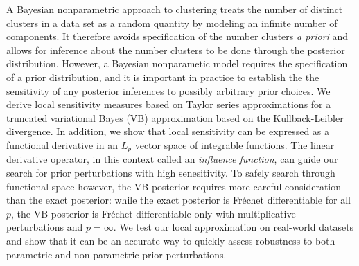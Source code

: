 A Bayesian nonparametric approach to clustering treats the number of distinct
clusters in a data set as a random quantity by modeling an infinite number of
components.  It therefore avoids specification of the number clusters \textit{a
priori} and allows for inference about the number clusters to be done through
the posterior distribution. However, a Bayesian nonparametic model requires the
specification of a prior distribution, and it is important in practice to
establish the the sensitivity of any posterior inferences to possibly arbitrary
prior choices. We derive local sensitivity measures based on Taylor series
approximations for a truncated variational Bayes (VB) approximation based on the
Kullback-Leibler divergence. In addition, we show that local sensitivity can be
expressed as a functional derivative in an $L_p$ vector space of integrable
functions. The linear derivative operator, in this context called an
\textit{influence function}, can guide our search for prior perturbations with
high senesitivity. To safely search through functional space however, the VB
posterior requires more careful consideration than the exact posterior: while
the exact posterior is Fr{\'e}chet differentiable for all $p$, the VB posterior
is Fr{\'e}chet differentiable only with multiplicative perturbations and
$p=\infty$. We test our local approximation on real-world datasets and show that
it can be an accurate way to quickly assess robustness to both parametric and
non-parametric prior perturbations.











